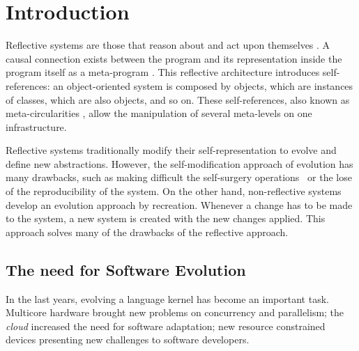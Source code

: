 
\chapter{Introduction}
\minitoc


Reflective systems are those that reason about and act upon themselves \cite{Smit84a}. A causal connection exists between the program and its representation inside the program itself as a meta-program \cite{Maes87a}. This reflective architecture introduces self-references:  an object-oriented system is composed by objects, which are instances of classes, which are also objects, and so on. These self-references, also known as meta-circularities \cite{Chib96a}, allow the manipulation of several meta-levels on one infrastructure.

Reflective systems traditionally modify their self-representation to evolve and define new abstractions. However, the self-modification approach of evolution has many drawbacks, such as making difficult the self-surgery operations~\cite{Casa09a} or the lose of the reproducibility of the system. On the other hand, non-reflective systems develop an evolution approach by recreation. Whenever a change has to be made to the system, a new system is created with the new changes applied. This approach solves many of the drawbacks of the reflective approach.


\section{The need for Software Evolution}

In the last years, evolving a language kernel has become an important task. Multicore hardware brought new problems on concurrency and parallelism; the \emph{cloud} increased the need for software adaptation; new resource constrained devices presenting new challenges to software developers.

